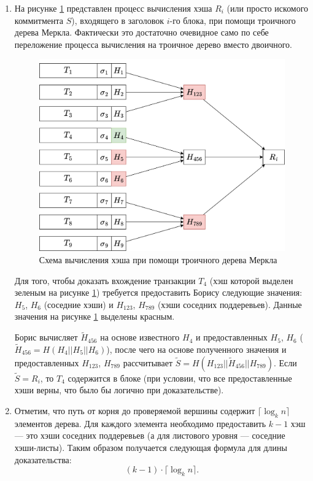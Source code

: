 \documentclass[12pt, a4paper]{extarticle}
\begin{document}
\begin{enumerate}
    \item На рисунке \ref{fig:2.1} представлен процесс вычисления хэша $R_i$ (или просто искомого
        коммитмента $S$), входящего в заголовок $i$-го блока, при помощи троичного дерева Меркла. 
        Фактически это достаточно очевидное само по себе переложение процесса вычисления на 
        троичное дерево вместо двоичного.
        \begin{figure}[h!]
            \centering
            \includegraphics[width=\textwidth]{2.1.png}
            \caption{Схема вычисления хэша при помощи троичного дерева Меркла}
            \label{fig:2.1}
        \end{figure}
        
        Для того, чтобы доказать вхождение транзакции $T_4$ (хэш которой выделен зеленым на рисунке
        \ref{fig:2.1}) требуется предоставить Борису следующие значения: $H_5$, $H_6$ (соседние
        хэши) и $H_{123}$, $H_{789}$ (хэши соседних поддеревьев). Данные значения на рисунке
        \ref{fig:2.1} выделены красным.
        
        Борис вычисляет $\tilde{H}_{456}$ на основе известного $H_4$ и предоставленных $H_5$, $H_6$
        ($\tilde{H}_{456} = H(H_4 || H_5 || H_6)$), после чего на основе полученного значения и
        предоставленных $H_{123}$, $H_{789}$ рассчитывает $\tilde{S} = H(H_{123} || \tilde{H}_{456}
        || H_{789})$. Если $\tilde{S} = R_i$, то $T_4$ содержится в блоке (при условии, что все 
        предоставленные хэши верны, что было бы логично при доказательстве).
    \item Отметим, что путь от корня до проверяемой вершины содержит $\lceil \log_k n \rceil$
        элементов дерева. Для каждого элемента необходимо предоставить $k - 1$ хэш --- это
        хэши соседних поддеревьев (а для листового уровня --- соседние хэши-листы). Таким
        образом получается следующая формула для длины доказательства: 
        \begin{equation}
            (k - 1) \cdot \lceil \log_k n \rceil.
        \end{equation}
        

\end{enumerate}
\end{document}
